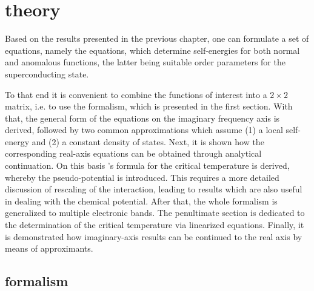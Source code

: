 
\chapter{ theory}

Based on the results presented in the previous chapter, one can formulate a set
of equations, namely the  equations, which determine
self-energies for both normal and anomalous  functions, the latter
being suitable order parameters for the superconducting state.

To that end it is convenient to combine the  functions of interest
into a $2 \times 2$ matrix, i.e. to use the  formalism, which is
presented in the first section. With that, the general form of the
 equations on the imaginary frequency axis is derived, followed
by two common approximations which assume (1) a local self-energy and (2) a
constant density of states. Next, it is shown how the corresponding real-axis
equations can be obtained through analytical continuation. On this basis
's formula for the critical temperature is derived, whereby the
 pseudo-potential is introduced. This requires a more detailed
discussion of rescaling of the  interaction, leading to results
which are also useful in dealing with the chemical potential. After that, the
whole formalism is generalized to multiple electronic bands. The penultimate
section is dedicated to the determination of the critical temperature via
linearized  equations. Finally, it is demonstrated how
imaginary-axis results can be continued to the real axis by means of 
approximants.

\section{ formalism}

